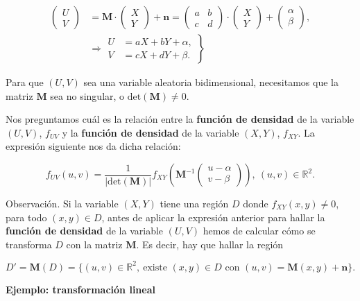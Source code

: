 \documentclass[
  letterpaper,
  DIV=11,
  numbers=noendperiod]{scrreprt}
\begin{document}
\[
\begin{array}{rl}
\begin{pmatrix}U\\ V\end{pmatrix} & =\mathbf{M}\cdot \begin{pmatrix}X\\ Y\end{pmatrix}+\mathbf{n}=\begin{pmatrix}a & b\\ c& d\end{pmatrix}\cdot\begin{pmatrix}X\\ Y\end{pmatrix}+\begin{pmatrix}\alpha\\\beta \end{pmatrix},\\  & \Rightarrow \left.\begin{array}{rl}U & = aX+bY+\alpha,\\ V & =cX+dY+\beta.\end{array}\right\}
\end{array}
\]

Para que \((U,V)\) sea una variable aleatoria bidimensional, necesitamos
que la matriz \(\mathbf{M}\) sea no singular, o
\(\mathrm{det}(\mathbf{M})\neq 0\).

Nos preguntamos cuál es la relación entre la \textbf{función de
densidad} de la variable \((U,V)\), \(f_{UV}\) y la \textbf{función de
densidad} de la variable \((X,Y)\), \(f_{XY}\). La expresión siguiente
nos da dicha relación:

\[
f_{UV}(u,v)=\frac{1}{|\mathrm{det}(\mathbf{M})|}f_{XY}\left(\mathbf{M}^{-1}\begin{pmatrix}u-\alpha\\ v-\beta\end{pmatrix}\right), \ (u,v)\in\mathbb{R}^2.
\]

Observación. Si la variable \((X,Y)\) tiene una región \(D\) donde
\(f_{XY}(x,y)\neq 0\), para todo \((x,y)\in D\), antes de aplicar la
expresión anterior para hallar la \textbf{función de densidad} de la
variable \((U,V)\) hemos de calcular cómo se transforma \(D\) con la
matriz \(\mathbf{M}\). Es decir, hay que hallar la región

\[
D'=\mathbf{M}(D)=\{(u,v)\in\mathbb{R}^2,\ \mbox{existe $(x,y)\in D$ con } (u,v)=\mathbf{M}(x,y)+\mathbf{n}\}.
\]

\textbf{Ejemplo: transformación lineal}
\end{document}
